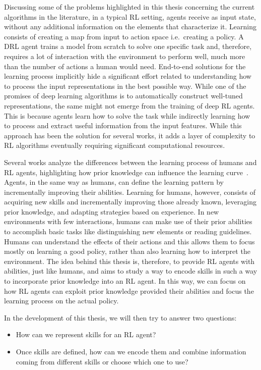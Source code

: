 Discussing some of the problems highlighted in this thesis concerning the current algorithms in the literature, in a typical RL setting, agents receive as input state, without any additional information on the elements that characterize it.
Learning consists of creating a map from input to action space i.e.\ creating a policy.
A DRL agent trains a model from scratch to solve one specific task and, therefore, requires a lot of interaction with the environment to perform well, much more than the number of actions a human would need.
End-to-end solutions for the learning process implicitly hide a significant effort related to understanding how to process the input representations in the best possible way.
While one of the promises of deep learning algorithms is to automatically construct well-tuned representations, the same might not emerge from the training of deep RL agents. 
This is because agents learn how to solve the task while indirectly learning how to process and extract useful information from the input features. 
While this approach has been the solution for several works, it adds a layer of complexity to RL algorithms eventually requiring significant computational resources.

Several works analyze the differences between the learning process of humans and RL agents, highlighting how prior knowledge can influence the learning curve~\citep{lake2017building, dubey2018investigating}.
Agents, in the same way as humans, can define the learning pattern by incrementally improving their abilities.
Learning for humans, however, consists of acquiring new skills and incrementally improving those already known, leveraging prior knowledge, and adapting strategies based on experience.
In new environments with few interactions, humans can make use of their prior abilities to accomplish basic tasks like distinguishing new elements or reading guidelines.
Humans can understand the effects of their actions and this allows them to focus mostly on learning a good policy, rather than also learning how to interpret the environment. 
The idea behind this thesis is, therefore, to provide RL agents with abilities, just like humans, and aims to study a way to encode skills in such a way to incorporate prior knowledge into an RL agent.
In this way, we can focus on how RL agents can exploit prior knowledge provided their abilities and focus the learning process on the actual policy.


In the development of this thesis, we will then try to answer two questions:
\begin{itemize}
    \item How can we represent skills for an RL agent?
    \item Once skills are defined, how can we encode them and combine information coming from different skills or choose which one to use?
\end{itemize}


